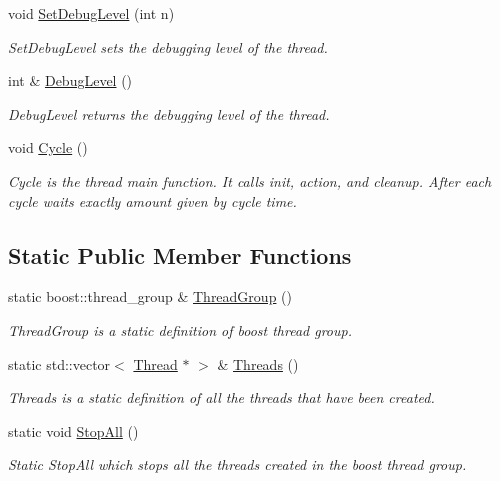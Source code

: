 \begin{DoxyCompactItemize}
void \hyperlink{classRCS_1_1Thread_a4bb0d136529374782030bf1bd19cad6d}{Set\-Debug\-Level} (int n)
\begin{DoxyCompactList}\small\item\em Set\-Debug\-Level sets the debugging level of the thread. \end{DoxyCompactList}\item 
int \& \hyperlink{classRCS_1_1Thread_abe304b8316eb45e0b01c1104376fbc41}{Debug\-Level} ()
\begin{DoxyCompactList}\small\item\em Debug\-Level returns the debugging level of the thread. \end{DoxyCompactList}\item 
void \hyperlink{classRCS_1_1Thread_a12ff1372b891db600b094d628e606045}{Cycle} ()
\begin{DoxyCompactList}\small\item\em Cycle is the thread main function. It calls init, action, and cleanup. After each cycle waits exactly amount given by cycle time. \end{DoxyCompactList}\end{DoxyCompactItemize}
\subsection*{Static Public Member Functions}
\begin{DoxyCompactItemize}
\item 
static boost\-::thread\-\_\-group \& \hyperlink{classRCS_1_1Thread_ae3269a75272f142bc8423ecef1d98d12}{Thread\-Group} ()
\begin{DoxyCompactList}\small\item\em Thread\-Group is a static definition of boost thread group. \end{DoxyCompactList}\item 
static std\-::vector$<$ \hyperlink{classRCS_1_1Thread}{Thread} $\ast$ $>$ \& \hyperlink{classRCS_1_1Thread_a9accd6dbb70083160c9d1aa21585b5f9}{Threads} ()
\begin{DoxyCompactList}\small\item\em Threads is a static definition of all the threads that have been created. \end{DoxyCompactList}\item 
static void \hyperlink{classRCS_1_1Thread_af87a4097886fda25c7527089548fe2c8}{Stop\-All} ()
\begin{DoxyCompactList}\small\item\em Static Stop\-All which stops all the threads created in the boost thread group. \end{DoxyCompactList}\end{DoxyCompactItemize}
